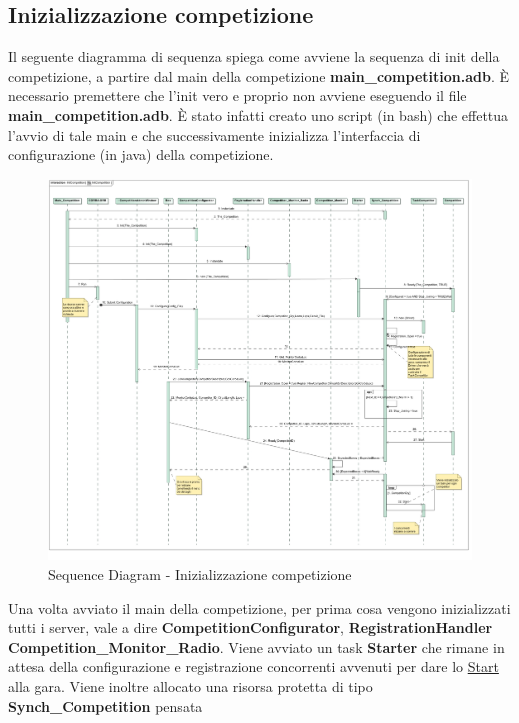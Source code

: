 \subsection{Inizializzazione competizione}
Il seguente diagramma di sequenza spiega come avviene la sequenza di init della competizione, a partire dal main della competizione \textbf{main\_competition.adb}.
\`{E} necessario premettere che l'init vero e proprio non avviene eseguendo il file \textbf{main\_competition.adb}. 
\`{E} stato infatti creato uno script (in bash) che effettua l'avvio di tale main e che successivamente inizializza 
l'interfaccia di configurazione (in java) della competizione.
\begin{center}
\begin{figure}[h!]
\advance\leftskip-3.2cm
	\includegraphics[angle=90,scale=0.35]{img/SequenceDiagrams/InitCompetition.jpg}
\caption{Sequence Diagram - Inizializzazione competizione}
\end{figure}
\end{center}
\clearpage
Una volta avviato il main della competizione, per prima cosa vengono inizializzati tutti i server, vale a dire \textbf{CompetitionConfigurator},
\textbf{RegistrationHandler} \textbf{Competition\_Monitor\_Radio}. Viene avviato un task \textbf{Starter} che rimane in attesa
della configurazione e registrazione concorrenti avvenuti per dare lo \underline{Start} alla gara. Viene inoltre allocato una risorsa protetta di tipo \textbf{Synch\_Competition} pensata
